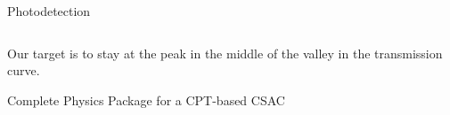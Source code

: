 \begin{frame}{Photodetection}
\begin{columns}[c, onlytextwidth]
\begin{column}{0.55\textwidth}
        \end{column}

    \end{columns}

    \vspace{10pt}

    Our target is to stay at the peak in the middle of the valley in the transmission curve.

\end{frame}



\begin{frame}{Complete Physics Package for a CPT-based CSAC}

    \begin{columns}[c, onlytextwidth]

        \begin{column}{0.35\textwidth}


\end{column}
\end{columns}
\end{frame}

